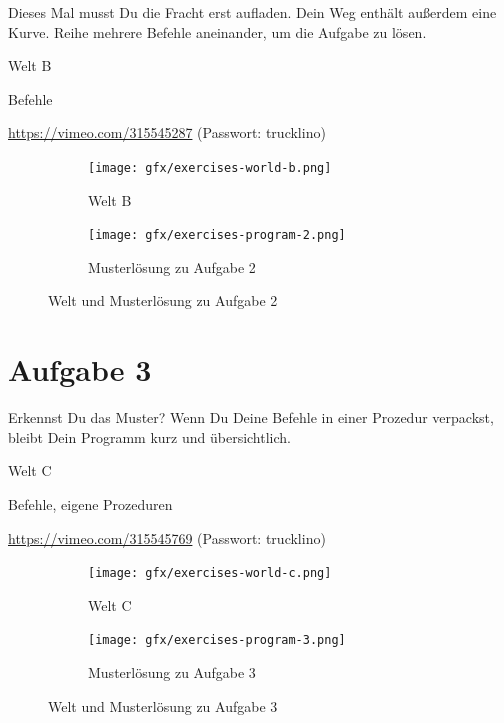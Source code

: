 Dieses Mal musst Du die Fracht erst aufladen. Dein Weg enthält außerdem eine Kurve. Reihe mehrere Befehle aneinander, um die Aufgabe zu lösen.

\begin{description}[noitemsep]
  \item[Welt wählen:] Welt B
  \item[Du brauchst:] Befehle
  \item[Video:] \url{https://vimeo.com/315545287} (Passwort: trucklino)
\end{description}

\begin{figure}[H]
  \begin{subfigure}[b]{0.40\textwidth}
    \texttt{[image: gfx/exercises-world-b.png]}
    \caption{Welt B}
  \end{subfigure}\hfill
  \begin{subfigure}[b]{0.40\textwidth}
    \texttt{[image: gfx/exercises-program-2.png]}
    \caption{Musterlösung zu Aufgabe 2}
  \end{subfigure}\hfill
  \caption{Welt und Musterlösung zu Aufgabe 2}
\end{figure}

\pagebreak

\section*{Aufgabe 3}
\label{sec:exercises:3}

Erkennst Du das Muster? Wenn Du Deine Befehle in einer Prozedur verpackst, bleibt Dein Programm kurz und übersichtlich.

\begin{description}[noitemsep]
  \item[Welt wählen:] Welt C
  \item[Du brauchst:] Befehle, eigene Prozeduren
  \item[Video:] \url{https://vimeo.com/315545769} (Passwort: trucklino)
\end{description}

\begin{figure}[H]
  \begin{subfigure}[b]{0.40\textwidth}
    \texttt{[image: gfx/exercises-world-c.png]}
    \caption{Welt C}
  \end{subfigure}\hfill
  \begin{subfigure}[b]{0.40\textwidth}
    \texttt{[image: gfx/exercises-program-3.png]}
    \caption{Musterlösung zu Aufgabe 3}
  \end{subfigure}\hfill
  \caption{Welt und Musterlösung zu Aufgabe 3}
\end{figure}

